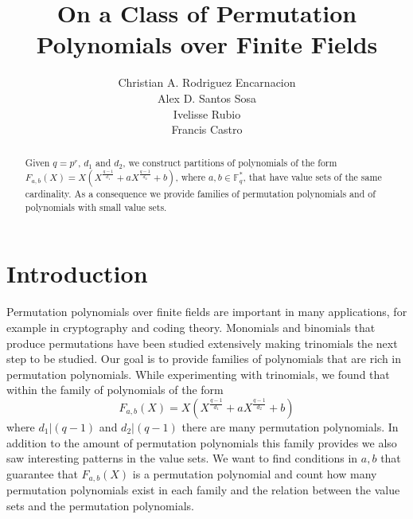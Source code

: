 \documentclass{article}
\theoremstyle{definition}
\theoremstyle{remark}
\numberwithin{equation}{section}
\begin{document}
\title{On a Class of Permutation Polynomials over Finite Fields}

\author{Christian A. Rodriguez Encarnacion \\ Alex D. Santos Sosa \\ Ivelisse Rubio \\ Francis Castro}

\maketitle

\begin{abstract}
Given $q=p^r$, $d_1$ and $d_2$, we construct partitions of polynomials of the form $F_{a,b}(X) =X\left(X^{\frac{q-1}{d_1}} + a X^{\frac{q-1}{d_2}} + b \right)$, where $a,b \in \mathbb{F}_{q}^{*}$, that have value sets of the same cardinality. As a consequence we provide families of permutation polynomials and of polynomials with small value sets. 

\end{abstract}


\section{Introduction}

Permutation polynomials over finite fields are important in many applications, for example in cryptography and coding theory. Monomials and binomials that produce permutations have been studied extensively making trinomials the next step to be studied. Our goal is to provide families of polynomials that are rich in permutation polynomials. While experimenting with trinomials, we found that within the family of polynomials of the form $$F_{a,b}(X) = X(X^{\frac{q-1}{d_1}} + aX^{\frac{q-1}{d_2}} +b)$$ where $d_1 | (q-1)$ and $d_2 | (q-1)$  there are many permutation polynomials. In addition to the amount of permutation polynomials this family provides we also saw interesting patterns in the value sets. We want to find conditions in $a,b$ that guarantee that $F_{a,b}(X)$ is a permutation polynomial and count how many permutation polynomials exist in each family and the relation between the value sets and the permutation polynomials.
\end{document}
